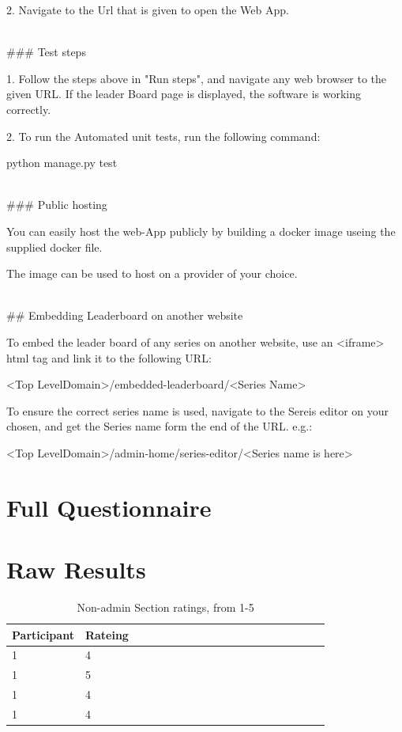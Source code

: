 \documentclass{l4proj}
\begin{document}
\begin{appendices}
2. Navigate to the Url that is given to open the Web App.

\hfill\\
\#\#\# Test steps

1. Follow the steps above in "Run steps", and navigate any web browser to the given URL. If the leader Board page is displayed, the software is working correctly.

2. To run the Automated unit tests, run the following command:

 python manage.py test

\hfill\\
\#\#\# Public hosting

You can easily host the web-App publicly by building a docker image useing the supplied docker file.

The image can be used to host on a provider of your choice.

\hfill\\
\#\# Embedding Leaderboard on another website

To embed the leader board of any series on another website, use an <iframe> html tag and link it to the following URL:

	<Top LevelDomain>/embedded-leaderboard/<Series Name>

To ensure the correct series name is used, navigate to the Sereis editor on your chosen, and get the Series name form the end of the URL. e.g.:


	<Top LevelDomain>/admin-home/series-editor/<Series name is here>



\section{Full Questionnaire} \label{apend:questions}


\section{Raw Results}

\begin{table}[!ht]
    \centering
    \caption{Non-admin Section ratings, from 1-5}
    \begin{tabular}{|l|p{0.8\linewidth}|}
    \hline
        \textbf{Participant} & \textbf{Rateing}  \\ \hline
        1 & 4  \\ \hline
        1 & 5  \\ \hline
        1 & 4  \\ \hline
        1 & 4  \\ \hline
    \end{tabular}
\end{table}


\end{appendices}
\end{document}

